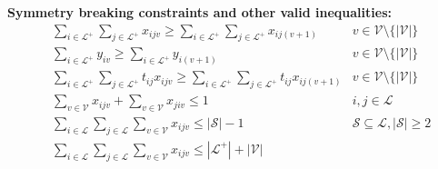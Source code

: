 \newpage
\textbf{Symmetry breaking constraints and other valid inequalities:}
\begin{eqnarray}
	    & \displaystyle\sum_{i\in \mathcal{L}^+}\displaystyle\sum_{j\in \mathcal{L}^+} x_{ijv} \geq \displaystyle\sum_{i\in \mathcal{L}^+}\displaystyle\sum_{j\in \mathcal{L}^+} x_{ij(v+1)} & v \in \mathcal{V} \setminus\{| \mathcal{V}|\} \label{eq:const_number_of_arcs_A}\\
	    & \displaystyle\sum_{i\in \mathcal{L}^+} y_{iv} \geq \displaystyle\sum_{i\in \mathcal{L}^+} y_{i(v+1)} & v \in \mathcal{V} \setminus\{| \mathcal{V}|\} \label{eq:const_number_of_visits_A} \\
	    & \displaystyle\sum_{i\in \mathcal{L}^+}\displaystyle\sum_{j\in \mathcal{L}^+} t_{ij}x_{ijv} \geq \displaystyle\sum_{i\in \mathcal{L}^+}\displaystyle\sum_{j\in \mathcal{L}^+} t_{ij}x_{ij(v+1)} & v \in \mathcal{V} \setminus\{| \mathcal{V}|\} \label{eq:const_total_time_used_A}\\
	    & \displaystyle\sum_{v\in \mathcal{V}} x_{ijv} + \displaystyle\sum_{v\in \mathcal{V}} x_{jiv} \leq 1 & i,j \in \mathcal{L} \label{eq:const_back_and_forth_A}\\
	    & \displaystyle\sum_{i\in \mathcal{L}} \displaystyle\sum_{j\in \mathcal{L}} \displaystyle\sum_{v\in \mathcal{V}} x_{ijv} \leq |\mathcal{S}|-1  & \mathcal{S} \subseteq \mathcal{L}, |\mathcal{S}|\geq 2 \label{eq:const_subtour_in_set_A}\\
	    & \displaystyle\sum_{i\in \mathcal{L}} \displaystyle\sum_{j\in \mathcal{L}} \displaystyle\sum_{v\in \mathcal{V}} x_{ijv}  \leq |\mathcal{L}^+|+|\mathcal{V}| \label{eq:const_arcs_less_then_locations_A}
\end{eqnarray}
\resumetocwriting
